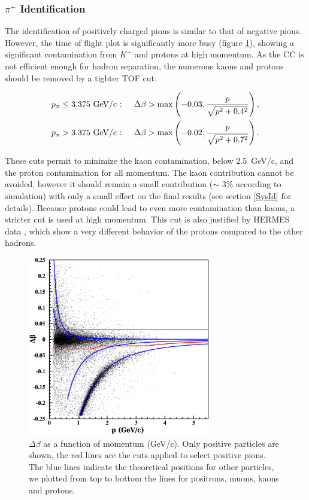 \subsubsection{$\pi^+$ Identification}

The identification of positively charged pions is similar to that of negative 
pions. However, the time of flight plot is significantly more busy (figure 
\ref{PipTOF}), showing a significant contamination from $K^+$ and protons at 
high momentum. As the CC is not efficient enough for hadron separation, the 
numerous kaons and protons should be removed by a tighter TOF cut:

\begin{subequations}\label{TOF-Pip}
\begin{align}
    p_\pi &\leq 3.375 \text{ GeV/c : }
  & \Delta \beta &> \max\left(-0.03,{p \over\sqrt{p^2+0.4^2}}\right), \\ 
    p_\pi &> 3.375    \text{ GeV/c : }
  & \Delta \beta &> \max\left(-0.02,{p \over\sqrt{p^2+0.7^2}}\right).
\end{align}
\end{subequations}

These cuts permit to minimize the kaon contamination, below 2.5~GeV/c, and the 
proton contamination for all momentum. The kaon contribution cannot be avoided, however 
it should remain a small contribution ($\sim$ 3\% according to simulation) 
with only a small effect on the final results (see section \ref{SysId} 
for details). Because protons could lead to even more contamination than kaons, 
a stricter cut is used at high momentum. This cut is also justified by 
HERMES data \cite{Airapetian:2007vu}, which show a very 
different behavior of the protons compared to the other hadrons.

\begin{figure}[tbp]
\centering
\includegraphics[width=8cm] {chap5-fig/pip_data.png} 
\caption {$\Delta \beta$ as a 
function of momentum (GeV/c). Only positive particles are shown, the red 
lines are the cuts applied to select positive pions. The blue lines indicate 
the theoretical positions for other particles, we plotted from top to 
bottom the lines for positrons, muons, kaons and protons.}
\label{PipTOF}
\end{figure}

